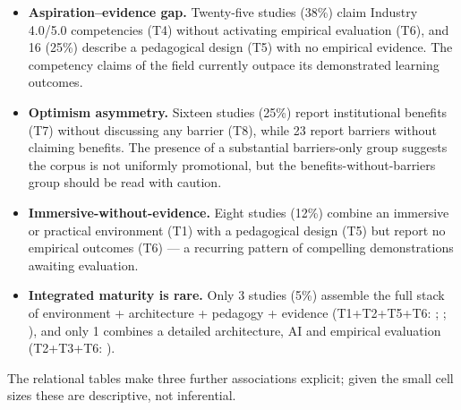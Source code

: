 \begin{itemize}
\tightlist
\item
  \textbf{Aspiration--evidence gap.} Twenty-five studies (38\%) claim Industry 4.0/5.0
  competencies (T4) without activating empirical evaluation (T6), and 16 (25\%)
  describe a pedagogical design (T5) with no empirical evidence. The competency
  claims of the field currently outpace its demonstrated learning outcomes.
\item
  \textbf{Optimism asymmetry.} Sixteen studies (25\%) report institutional benefits
  (T7) without discussing any barrier (T8), while 23 report barriers without
  claiming benefits. The presence of a substantial barriers-only group suggests
  the corpus is not uniformly promotional, but the benefits-without-barriers
  group should be read with caution.
\item
  \textbf{Immersive-without-evidence.} Eight studies (12\%) combine an immersive or
  practical environment (T1) with a pedagogical design (T5) but report no
  empirical outcomes (T6) --- a recurring pattern of compelling demonstrations
  awaiting evaluation.
\item
  \textbf{Integrated maturity is rare.} Only 3 studies (5\%) assemble the full stack
  of environment + architecture + pedagogy + evidence (T1+T2+T5+T6:
  \citet{sakkas_multiplayer_2025}; \citet{tarng_application_2024}; \citet{terkaj_framework_2024}), and
  only 1 combines a detailed architecture, AI and empirical evaluation
  (T2+T3+T6: \citet{machado_automatic_2025}).
\end{itemize}

The relational tables make three further associations explicit; given the small
cell sizes these are descriptive, not inferential.

